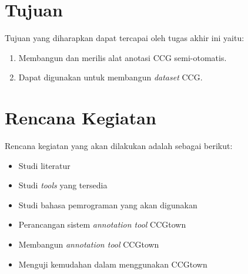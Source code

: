 \section{Tujuan}
Tujuan yang diharapkan dapat tercapai oleh tugas akhir ini yaitu:
\begin{enumerate}
    \item Membangun dan merilis alat anotasi CCG semi-otomatis.
    \item Dapat digunakan untuk membangun \textit{dataset} CCG.
\end{enumerate}
\section{Rencana Kegiatan}
Rencana kegiatan yang akan dilakukan adalah sebagai berikut:
\begin{itemize}
    \item Studi literatur
    \item Studi \textit{tools} yang tersedia
    \item Studi bahasa pemrograman yang akan digunakan
    \item Perancangan sistem \textit{annotation tool} CCGtown
    \item Membangun \textit{annotation tool} CCGtown
    \item Menguji kemudahan dalam menggunakan CCGtown
\end{itemize}


